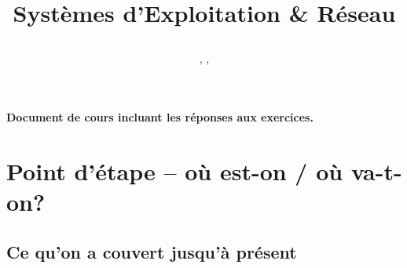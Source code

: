 \documentclass[12pt]{article}
\title
	{\vspace{3cm}
		{\Large
		\textit
			{
				\classe\hspace{0.1cm}
				\textemdash\
				\hspace{0.1cm}
				\themecours
			}
			
		\vspace{1cm}
		\huge{Systèmes d'Exploitation \& Réseau} }
		 
		\vspace{1cm}
	}
\author{\etablissement}
\date{
	\auteur,
	\datedoc,
	\footnotesize{\textit{\versiondoc}} 
	\vspace{2cm}
	}
\begin{document}
	
	\maketitle
	\thispagestyle{empty}
		
	\section*{}
		{\noindent
		\resumecours
		}
	
	\vspace{2cm}
	\begin{MaReponse}
		\centering
		\vspace{\baselineskip}
		\textbf{Document de cours incluant les réponses aux exercices.}
		\vspace{\baselineskip}
	\end{MaReponse}
		
	\pagebreak	
	\tableofcontents
	
	\pagebreak
	

	\section{Point d'étape -- où est-on / où va-t-on?}
	\subsection{Ce qu'on a couvert jusqu'à présent}
	
\end{document}
